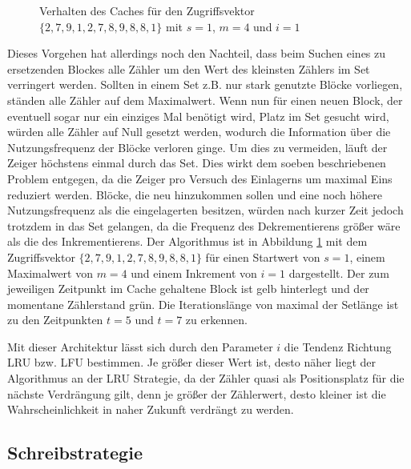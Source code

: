 \begin{figure}[b!]\centering
    \caption[Verhalten des Caches]{Verhalten des Caches für den Zugriffsvektor $\{2,7,9,1,2,7,8,9,8,8,1 \}$ mit $s=1$, $m=4$ und $i=1$ }
    \label{img:zeit}
\end{figure}

Dieses Vorgehen hat allerdings noch den Nachteil, dass beim Suchen eines zu ersetzenden Blockes alle Zähler um den Wert des kleinsten Zählers im Set verringert
werden. Sollten in einem Set z.B. nur stark genutzte Blöcke vorliegen, ständen alle Zähler auf dem Maximalwert. Wenn nun für einen neuen Block, der eventuell
sogar nur ein einziges Mal benötigt wird, Platz im Set gesucht wird, würden alle Zähler auf Null gesetzt werden, wodurch die Information über die
Nutzungsfrequenz der Blöcke verloren ginge. Um dies zu vermeiden, läuft der Zeiger höchstens einmal durch das Set. Dies wirkt dem soeben beschriebenen Problem
entgegen, da die Zeiger pro Versuch des Einlagerns um maximal Eins reduziert werden. Blöcke, die neu hinzukommen sollen und eine noch höhere Nutzungsfrequenz
als die eingelagerten besitzen, würden nach kurzer Zeit jedoch trotzdem in das Set gelangen, da die Frequenz des Dekrementierens größer wäre als die des
Inkrementierens. Der Algorithmus ist in Abbildung \ref{img:zeit} mit dem Zugriffsvektor $\{2,7,9,1,2,7,8,9,8,8,1 \}$ für einen Startwert von $s=1$, einem
Maximalwert von $m=4$ und einem Inkrement von $i=1$ dargestellt. Der zum jeweiligen Zeitpunkt im Cache gehaltene Block ist gelb hinterlegt und der momentane
Zählerstand grün. Die Iterationslänge von maximal der Setlänge ist zu den Zeitpunkten $t=5$ und $t=7$ zu erkennen.

Mit dieser Architektur lässt sich durch den Parameter $i$ die Tendenz Richtung \ac{LRU} bzw. \ac{LFU} bestimmen. Je größer dieser Wert ist, desto
näher liegt der Algorithmus an der \ac{LRU} Strategie, da der Zähler quasi als Positionsplatz für die nächste Verdrängung gilt, denn je größer der Zählerwert,
desto kleiner ist die Wahrscheinlichkeit in naher Zukunft verdrängt zu werden.

\subsection{Schreibstrategie}
\label{chap5:algo2}

